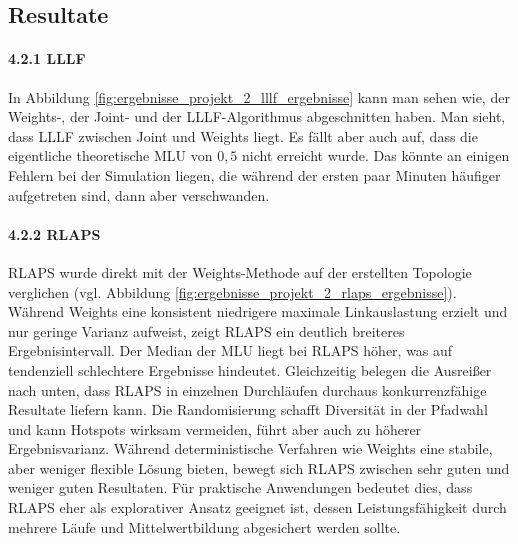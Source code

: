 \documentclass[sigconf,nonacm,review,language=english,language=german]{acmart}
\begin{document}
    \subsection{Resultate}
        \paragraph{4.2.1   LLLF}
            In Abbildung \ref{fig:ergebnisse_projekt_2_lllf_ergebnisse} kann man sehen wie, der Weights-, der Joint- und der LLLF-Algorithmus abgeschnitten haben. Man sieht, dass LLLF zwischen Joint und Weights liegt. Es fällt aber auch auf, dass die eigentliche theoretische MLU von $0,5$ nicht erreicht wurde. Das könnte an einigen Fehlern bei der Simulation liegen, die während der ersten paar Minuten häufiger aufgetreten sind, dann aber verschwanden.
        
        \paragraph{4.2.2   RLAPS}
            RLAPS wurde direkt mit der Weights-Methode auf der erstellten Topologie verglichen (vgl. Abbildung \ref{fig:ergebnisse_projekt_2_rlaps_ergebnisse}). Während Weights eine konsistent niedrigere maximale Linkauslastung erzielt und nur geringe Varianz aufweist, zeigt RLAPS ein deutlich breiteres Ergebnisintervall. Der Median der MLU liegt bei RLAPS höher, was auf tendenziell schlechtere Ergebnisse hindeutet. Gleichzeitig belegen die Ausreißer nach unten, dass RLAPS in einzelnen Durchläufen durchaus konkurrenzfähige Resultate liefern kann.
            Die Randomisierung schafft Diversität in der Pfadwahl und kann Hotspots wirksam vermeiden, führt aber auch zu höherer Ergebnisvarianz. Während deterministische Verfahren wie Weights eine stabile, aber weniger flexible Lösung bieten, bewegt sich RLAPS zwischen sehr guten und weniger guten Resultaten. Für praktische Anwendungen bedeutet dies, dass RLAPS eher als explorativer Ansatz geeignet ist, dessen Leistungsfähigkeit durch mehrere Läufe und Mittelwertbildung abgesichert werden sollte.
        
        
\end{document}
